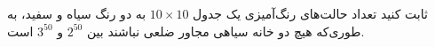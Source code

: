       \p
      ثابت کنید تعداد حالت‌های رنگ‌آمیزی یک جدول $10\times10$ به دو رنگ سیاه و سفید، به طوری‌که هیچ دو خانه سیاهی مجاور ضلعی نباشند بین $2^{50}$ و $3^{50}$ است.
